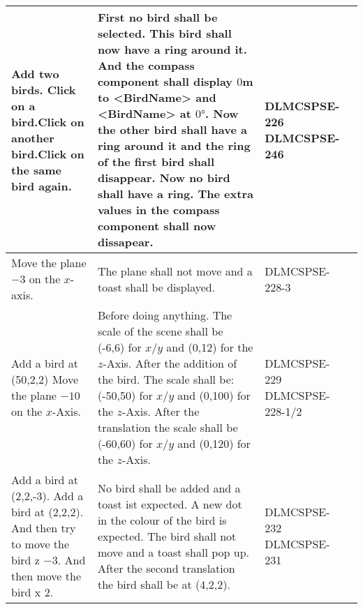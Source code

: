 \begin{xltabular}{\textwidth}{|X|X|M{2cm}|M{2cm}|}
  Add two birds. \newline Click on a bird.\newline Click on another bird.\newline Click on the same bird again.\newline & First no bird shall be selected. \newline This bird shall now have a ring around it. And the compass component shall display $0$m to <BirdName> and <BirdName> at $0°$. \newline Now the other bird shall have a ring around it and the ring of the first bird shall disappear. \newline Now no bird shall have a ring. The extra values in the compass component shall now dissapear. & {\color{purpleT}\ttfamily DLMCSPSE-226 \newline DLMCSPSE-246} &  \\ \hline 
  Move the plane $-3$ on the $x$-axis. & The plane shall not move and a toast shall be displayed. & {\color{purpleT}\ttfamily DLMCSPSE-228-3} &  \\ \hline 
  Add a bird at {\ttfamily (50,2,2)} \newline Move the plane $-10$ on the $x$-Axis. & Before doing anything. The scale of the scene shall be {\ttfamily (-6,6)} for $x$/$y$ and {\ttfamily (0,12)} for the $z$-Axis. \newline After the addition of the bird. The scale shall be: {\ttfamily (-50,50)} for $x$/$y$ and {\ttfamily (0,100)} for the $z$-Axis. \newline After the translation the scale shall be {\ttfamily (-60,60)} for $x$/$y$ and {\ttfamily (0,120)} for the $z$-Axis. & {\color{purpleT}\ttfamily DLMCSPSE-229 \newline DLMCSPSE-228-1/2} &  \\ \hline 
  Add a bird at {\ttfamily (2,2,-3)}. \newline  Add a bird at {\ttfamily (2,2,2)}. And then try to move the bird z $-3$. \newline And then move the bird x $2$. & No bird shall be added and a toast ist expected. \newline A new dot in the colour of the bird is expected. \newline The bird shall not move and a toast shall pop up. \newline After the second translation the bird shall be at {\ttfamily (4,2,2)}. & {\color{purpleT}\ttfamily DLMCSPSE-232 \newline DLMCSPSE-231} &  \\ \hline 

\end{xltabular}
